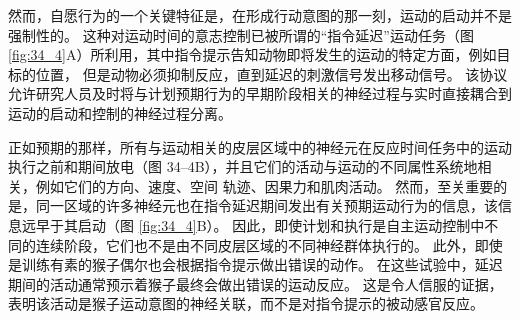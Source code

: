 然而，自愿行为的一个关键特征是，在形成行动意图的那一刻，运动的启动并不是强制性的。
这种对运动时间的意志控制已被所谓的“指令延迟”运动任务（图 \ref{fig:34_4}A）所利用，其中指令提示告知动物即将发生的运动的特定方面，例如目标的位置， 但是动物必须抑制反应，直到延迟的刺激信号发出移动信号。
该协议允许研究人员及时将与计划预期行为的早期阶段相关的神经过程与实时直接耦合到运动的启动和控制的神经过程分离。


正如预期的那样，所有与运动相关的皮层区域中的神经元在反应时间任务中的运动执行之前和期间放电（图 34–4B），并且它们的活动与运动的不同属性系统地相关，例如它们的方向、速度、空间 轨迹、因果力和肌肉活动。
然而，至关重要的是，同一区域的许多神经元也在指令延迟期间发出有关预期运动行为的信息，该信息远早于其启动（图 \ref{fig:34_4}B）。
因此，即使计划和执行是自主运动控制中不同的连续阶段，它们也不是由不同皮层区域的不同神经群体执行的。 此外，即使是训练有素的猴子偶尔也会根据指令提示做出错误的动作。
在这些试验中，延迟期间的活动通常预示着猴子最终会做出错误的运动反应。
这是令人信服的证据，表明该活动是猴子运动意图的神经关联，而不是对指令提示的被动感官反应。


